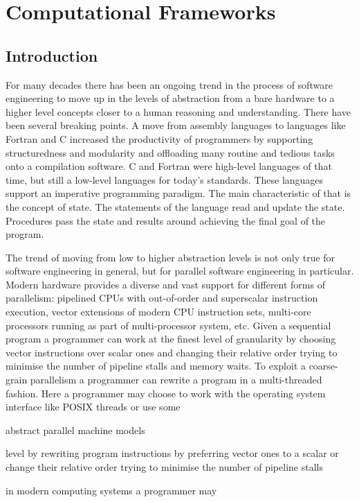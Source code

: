 \chapter{Computational Frameworks}

\section{Introduction}
\quad For many decades there has been an ongoing trend in the process of software engineering to move up in the levels of abstraction from a bare hardware to a higher level concepts closer to a human reasoning and understanding. There have been several breaking points. A move from assembly languages to languages like Fortran and C increased the productivity of programmers by supporting structuredness and modularity and offloading many routine and tedious tasks onto a compilation software. C and Fortran were high-level languages of that time, but still a low-level languages for today's standards. These languages support an imperative programming paradigm. The main characteristic of that is the concept of state. The statements of the language read and update the state. Procedures pass the state and results around achieving the final goal of the program.   

\quad The trend of moving from low to higher abstraction levels is not only true for software engineering in general, but for parallel software engineering in particular. Modern hardware provides a diverse and vast support for different forms of parallelism: pipelined CPUs with out-of-order and superscalar instruction execution, vector extensions of modern CPU instruction sets, multi-core processors running as part of multi-processor system, etc. Given a sequential program a programmer can work at the finest level of granularity by choosing vector instructions over scalar ones and changing their relative order trying to minimise the number of pipeline stalls and memory waits. To exploit a coarse-grain parallelism a programmer can rewrite a program in a multi-threaded fashion. Here a programmer may choose to work with the operating system interface like POSIX threads or use some 

abstract parallel machine models   


level by rewriting program instructions by preferring vector ones to a scalar or change their relative order trying to minimise the number of pipeline stalls    

in modern computing systems a programmer may 

